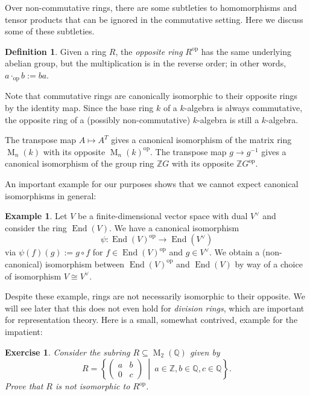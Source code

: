 \documentclass[12pt]{article}
\theoremstyle{plain}
\newtheorem{exercise}[theorem]{Exercise}
\theoremstyle{definition}
\newtheorem{definition}[theorem]{Definition}
\newtheorem{example}[theorem]{Example}
\theoremstyle{remark}
\numberwithin{equation}{section}
\begin{document}
Over non-commutative rings, there are some subtleties to homomorphisms
and tensor products that can be ignored in the commutative setting.
Here we discuss some of these subtleties.

\begin{definition}
Given a ring $R$, the \emph{opposite ring} $R^{\mathrm{op}}$ has
the same underlying abelian group, but the multiplication is in the
reverse order; in other words, $a \cdot_{\mathrm{op}} b := ba$.
\end{definition}

Note that commutative rings are canonically isomorphic to their
opposite rings by the identity map.
Since the base ring $k$ of a $k$-algebra is always commutative,
the opposite ring of a (possibly non-commutative)
$k$-algebra is still a $k$-algebra.

The transpose map $A \mapsto A^T$ gives a canonical isomorphism
of the matrix ring $\operatorname{M}_n(k)$ with its opposite
$\operatorname{M}_n(k)^{\mathrm{op}}$.
The transpose map $g \to g^{-1}$ gives a canonical isomorphism
of the group ring $\mathbb{Z}G$ with its opposite
$\mathbb{Z}G^{\mathrm{op}}$.

An important example for our purposes shows that we cannot expect
canonical isomorphisms in general:

\begin{example}
Let $V$ be a finite-dimensional vector space with dual $V^\vee$
and consider the ring $\operatorname{End}(V)$.
We have a canonical isomorphism
\[
\psi : \operatorname{End}(V)^{\mathrm{op}} \to \operatorname{End}(V^\vee)
\]
via $\psi(f)(g):=g \circ f$ for $f \in
\operatorname{End}(V)^{\mathrm{op}}$ and $g \in V^\vee$.
We obtain a (non-canonical) isomorphism between
$\operatorname{End}(V)^{\mathrm{op}}$ and $\operatorname{End}(V)$
by way of a choice of isomorphism $V \cong V^\vee$.
\end{example}

Despite these example, rings are not necessarily isomorphic to their opposite.
We will see later that this does not even hold for \emph{division
rings}, which are important for representation theory.
Here is a small, somewhat contrived, example for the impatient: 

\begin{exercise}
Consider the subring $R \subseteq \operatorname{M}_2(\mathbb{Q})$
given by
\[
R = \left\{ \begin{pmatrix} a & b\\ 0 & c \end{pmatrix}\ \middle|\
a \in \mathbb{Z}, b \in \mathbb{Q}, c \in \mathbb{Q} \right\}.
\]
Prove that $R$ is not isomorphic to $R^{\mathrm{op}}$.
\end{exercise}
\end{document}
